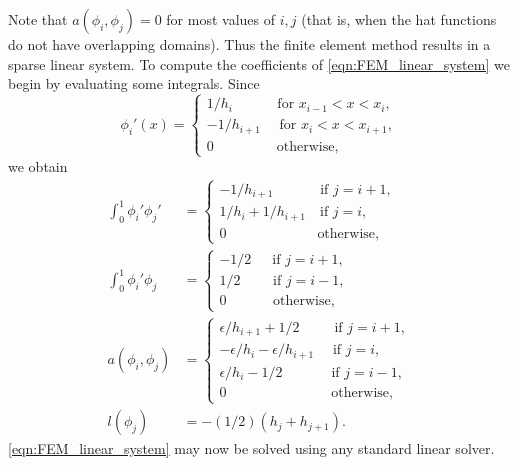 Note that $a(\phi_i,\phi_j) = 0$ for most values of $i, j$ (that is, when the hat functions do not have overlapping domains).
Thus the finite element method results in a sparse linear system.
To compute the coefficients of \eqref{eqn:FEM_linear_system} we begin by evaluating some integrals.
Since
\[\phi_i'(x) = \begin{cases}
1/h_i \quad \quad \quad \, \text{for } x_{i-1} < x < x_i,\\
 -1/h_{i+1} \quad \text{ for } x_{i} < x < x_{i+1},\\
0 \quad \quad \quad \quad \, \text{ otherwise},
\end{cases}\]
we obtain
\begin{align*}
\int_0^1  \phi_i'\phi_j' &= \begin{cases}
- 1/h_{i+1} \quad \quad \quad \text{ if } j=i+1,\\
1/h_i + 1/h_{i+1} \quad \text{if } j=i,\\
0 \quad \quad \quad \quad \quad \quad \, \text{ otherwise},
\end{cases} \\
\int_0^1  \phi_i'\phi_j &= \begin{cases}
- 1/2 \quad \,\text{ if } j=i+1,\\
1/2 \quad \quad \text{ if } j=i-1,\\
0 \quad \quad \quad \text{ otherwise},
\end{cases} \\
a(\phi_i,\phi_j) &= \begin{cases}
\epsilon/h_{i+1} + 1/2 \quad \quad \, \text{ if } j=i+1,\\
-\epsilon/h_i -\epsilon/h_{i+1} \quad  \text{ if } j=i,\\
\epsilon/h_i - 1/2 \quad \quad \quad \, \text{ if } j=i-1,\\
0 \quad \quad \quad \quad \quad \quad \,\,\,\,\,\,\, \text{ otherwise},
\end{cases}\\
l(\phi_j) &= -(1/2)(h_j + h_{j+1}).
\end{align*}
\eqref{eqn:FEM_linear_system} may now be solved using any standard linear solver.

